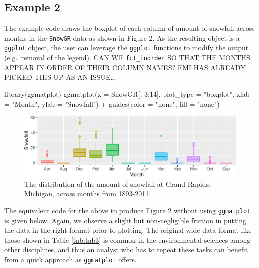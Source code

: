 \documentclass[10pt,a4paper,onecolumn]{article}
\newenvironment{Shaded}{\begin{snugshade}}{\end{snugshade}}
\newcommand{\AttributeTok}[1]{\textcolor[rgb]{0.77,0.63,0.00}{#1}}
\newcommand{\DecValTok}[1]{\textcolor[rgb]{0.00,0.00,0.81}{#1}}
\newcommand{\FunctionTok}[1]{\textcolor[rgb]{0.00,0.00,0.00}{#1}}
\newcommand{\NormalTok}[1]{#1}
\newcommand{\SpecialCharTok}[1]{\textcolor[rgb]{0.00,0.00,0.00}{#1}}
\newcommand{\StringTok}[1]{\textcolor[rgb]{0.31,0.60,0.02}{#1}}
\begin{document}
\hypertarget{example-2}{%
\subsection{Example 2}\label{example-2}}

The example code draws the boxplot of each column of amount of snowfall
across months in the \texttt{SnowGR} data as shown in Figure 2. As the
resulting object is a \texttt{ggplot} object, the user can leverage the
\texttt{ggplot} functions to modify the output (e.g.~removal of the
legend). CAN WE \texttt{fct\_inorder} SO THAT THE MONTHS APPEAR IN ORDER
OF THEIR COLUMN NAMES? EMI HAS ALREADY PICKED THIS UP AS AN
ISSUE\ldots{}

\begin{Shaded}
\begin{Highlighting}[]
\FunctionTok{library}\NormalTok{(ggmatplot)}
\FunctionTok{ggmatplot}\NormalTok{(}\AttributeTok{x =}\NormalTok{ SnowGR[, }\DecValTok{3}\SpecialCharTok{:}\DecValTok{14}\NormalTok{], }\AttributeTok{plot\_type =} \StringTok{"boxplot"}\NormalTok{,}
          \AttributeTok{xlab =} \StringTok{"Month"}\NormalTok{,  }\AttributeTok{ylab =} \StringTok{"Snowfall"}\NormalTok{) }\SpecialCharTok{+}
  \FunctionTok{guides}\NormalTok{(}\AttributeTok{color =} \StringTok{"none"}\NormalTok{, }\AttributeTok{fill =} \StringTok{"none"}\NormalTok{)}
\end{Highlighting}
\end{Shaded}

\begin{figure}
\centering
\includegraphics{paper_files/figure-latex/matplot3-1.pdf}
\caption{The distribution of the amount of snowfall at Grand Rapids,
Michigan, across months from 1893-2011.}
\end{figure}

The equivalent code for the above to produce Figure 2 without using
\texttt{ggmatplot} is given below. Again, we observe a slight but
non-negligible friction in putting the data in the right format prior to
plotting. The original wide data format like those shown in Table
\ref{tab:tab3} is common in the environmental sciences among other
disciplines, and thus an analyst who has to repeat these tasks can
benefit from a quick approach as \texttt{ggmatplot} offers.
\end{document}
